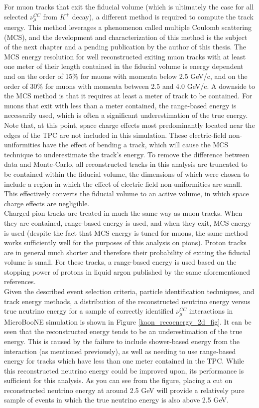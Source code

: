 For muon tracks that exit the fiducial volume (which is ultimately the case for all selected $\nu_\mu^{CC}$ from $K^+$ decay), a different method is required to compute the track energy. This method leverages a phenomenon called multiple Coulomb scattering (MCS), and the development and characterization of this method is the subject of the next chapter and a pending publication by the author of this thesis. The MCS energy resolution for well reconstructed exiting muon tracks with at least one meter of their length contained in the fiducial volume is energy dependent and on the order of 15\% for muons with momenta below 2.5 GeV/c, and on the order of 30\% for muons with momenta between 2.5 and 4.0 GeV/c. A downside to the MCS method is that it requires at least a meter of track to be contained. For muons that exit with less than a meter contained, the range-based energy is necessarily used, which is often a significant underestimation of the true energy. Note that, at this point, space charge effects most predominantly located near the edges of the TPC are not included in this simulation. These electric-field non-uniformities have the effect of bending a track, which will cause the MCS technique to underestimate the track's energy. To remove the difference between data and Monte-Carlo, all reconstructed tracks in this analysis are truncated to be contained within the fiducial volume, the dimensions of which were chosen to include a region in which the effect of electric field non-uniformities are small. This effectively converts the fiducial volume to an active volume, in which space charge effects are negligible.\\

Charged pion tracks are treated in much the same way as muon tracks. When they are contained, range-based energy is used, and when they exit, MCS energy is used (despite the fact that MCS energy is tuned for muons, the same method works sufficiently well for the purposes of this analysis on pions). Proton tracks are in general much shorter and therefore their probability of exiting the fiducial volume is small. For these tracks, a range-based energy is used based on the stopping power of protons in liquid argon published by the same aforementioned references.\\

Given the described event selection criteria, particle identification techniques, and track energy methods, a distribution of the reconstructed neutrino energy versus true neutrino energy for a sample of correctly identified $\nu_\mu^{CC}$ interactions in MicroBooNE simulation is shown in Figure \ref{kaon_recoenergy_2d_fig}. It can be seen that the reconstructed energy tends to be an underestimation of the true energy. This is caused by the failure to include shower-based energy from the interaction (as mentioned previously), as well as needing to use range-based energy for tracks which have less than one meter contained in the TPC. While this reconstructed neutrino energy could be improved upon, its performance is sufficient for this analysis. As you can see from the figure, placing a cut on reconstructed neutrino energy at around 2.5 GeV will provide a relatively pure sample of events in which the true neutrino energy is also above 2.5 GeV.

